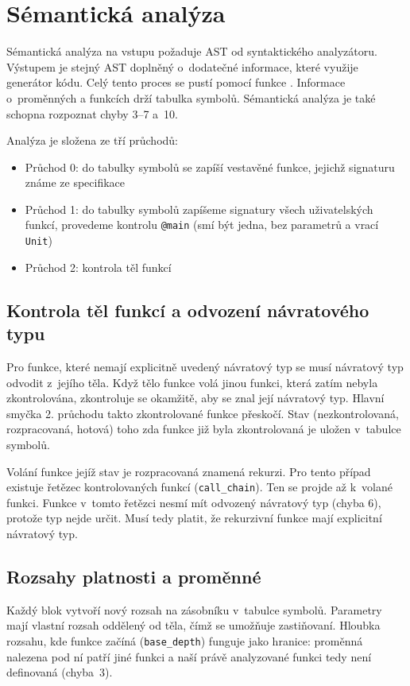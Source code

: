 \section{Sémantická analýza}\label{sec:semantika}

  Sémantická analýza na vstupu požaduje AST od syntaktického analyzátoru. Výstupem je
  stejný AST doplněný o~dodatečné informace, které využije generátor kódu.
  Celý tento proces se pustí pomocí funkce . Informace o~proměnných
  a funkcích drží tabulka symbolů. Sémantická analýza je také schopna rozpoznat
  chyby 3--7 a~10.

  Analýza je složena ze tří průchodů:
  \begin{itemize}
    \item Průchod 0: do tabulky symbolů se zapíší vestavěné funkce, jejichž signaturu známe ze specifikace
    \item Průchod 1: do tabulky symbolů zapíšeme signatury všech uživatelských funkcí, provedeme kontrolu \texttt{@main} (smí být jedna, bez parametrů a vrací \texttt{Unit})
    \item Průchod 2: kontrola těl funkcí
  \end{itemize}

  \subsection {Kontrola těl funkcí a odvození návratového typu}
  Pro funkce, které nemají explicitně uvedený návratový typ se musí návratový typ odvodit z~jejího těla.
  Když tělo funkce volá jinou funkci, která zatím nebyla zkontrolována, zkontroluje se okamžitě, aby se znal
  její návratový typ. Hlavní smyčka 2. průchodu takto zkontrolované funkce přeskočí.
  Stav (nezkontrolovaná, rozpracovaná, hotová) toho zda funkce již byla zkontrolovaná je uložen v~tabulce symbolů.

  Volání funkce jejíž stav je rozpracovaná znamená rekurzi. Pro tento případ existuje řetězec
  kontrolovaných funkcí (\texttt{call\_chain}). Ten se projde až k~volané funkci. Funkce v~tomto řetězci nesmí mít
  odvozený návratový typ (chyba 6), protože typ nejde určit. Musí tedy platit, že rekurzivní funkce mají explicitní
  návratový typ.

  \subsection{Rozsahy platnosti a proměnné}
  Každý blok vytvoří nový rozsah na zásobníku v~tabulce symbolů. Parametry mají vlastní rozsah oddělený od těla, čímž se umožňuje
  zastiňovaní. Hloubka rozsahu, kde funkce začíná (\texttt{base\_depth}) funguje jako hranice: proměnná nalezena pod ní patří
  jiné funkci a naší právě analyzované funkci tedy není definovaná (chyba~3).

